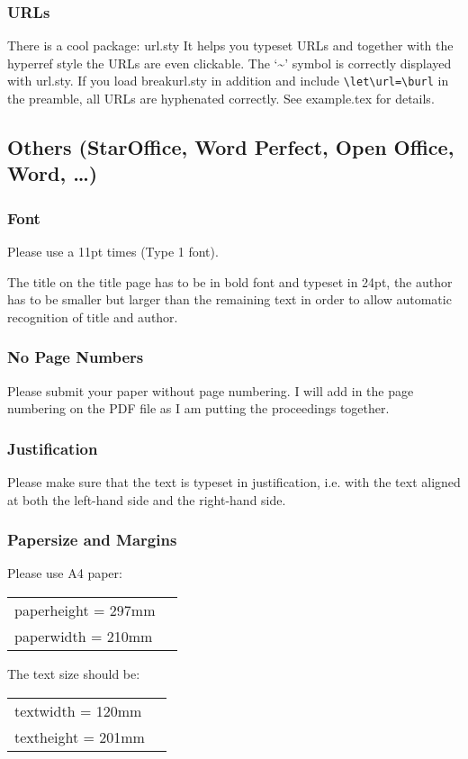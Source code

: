 \documentclass[11pt,a4paper,fleqn]{article}
\begin{document}
\subsubsection{URLs}

There is a cool package: url.sty It helps you typeset URLs and together with the hyperref style the
URLs are even clickable. The `\~{}' symbol is correctly displayed with url.sty. If you load
breakurl.sty in addition and include \verb+\let\url=\burl+ in the preamble, all URLs are hyphenated
correctly. See example.tex for details.





\subsection{Others (StarOffice, Word Perfect, Open Office, Word, \ldots)}

\subsubsection{Font}

Please use a 11pt times (Type 1 font). 

The title on the title page has to be in bold font and typeset in 24pt, the author has to be smaller but larger than
the remaining text in order to allow automatic recognition of title and author. 

\subsubsection{No Page Numbers}

Please submit your paper without page numbering.  I will add in
the page numbering on the PDF file as I am putting the
proceedings together.

\subsubsection{Justification}

Please make sure that the text is typeset in justification,
i.e. with the text aligned at both the left-hand side and the right-hand side.

\subsubsection{Papersize and Margins}
\label{margins}

Please use A4 paper:
\begin{table}[H]
\begin{tabular}{@{}ll}
paperheight  = 297mm\\
paperwidth   = 210mm
\end{tabular}
\end{table}
%
The text size should be:
\begin{table}[H]
\begin{tabular}{@{}ll}
textwidth  = 120mm\\
textheight = 201mm
\end{tabular}
\end{table}
\end{document}
